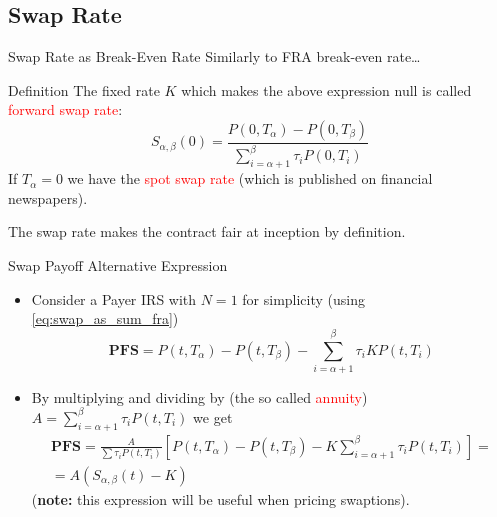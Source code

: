 \documentclass{beamer}
\begin{document}
\subsection{Swap Rate}
\begin{frame}{Swap Rate as Break-Even Rate}
	Similarly to FRA break-even rate\ldots
	\begin{block}{Definition}
	The fixed rate $K$ which makes the above expression null is called \textcolor{red}{forward swap rate}:
	\begin{equation}
		S_{\alpha,\beta}(0) = \frac{P(0, T_\alpha)-P(0,T_\beta)}{\sum_{i=\alpha+1}^{\beta}\tau_iP(0,T_i)}
	\end{equation}
	If $T_\alpha=0$ we have the \textcolor{red}{spot swap rate} (which is published on financial newspapers).
	\end{block}
	The swap rate makes the contract fair at inception by definition.
\end{frame}

\begin{frame}{Swap Payoff Alternative Expression}
	\begin{itemize}
		\item<1-> Consider a Payer IRS with $N=1$ for simplicity (using \cref{eq:swap_as_sum_fra})
		\begin{equation*}
			\textbf{PFS} = P(t,T_\alpha)-P(t,T_\beta)-\sum_{i=\alpha+1}^{\beta}\tau_iKP(t,T_i)
		\end{equation*}
		\item<2-> By multiplying and dividing by (the so called \textcolor{red}{annuity}) $A = \sum_{i=\alpha+1}^{\beta}\tau_i P(t, T_i)$
		we get
		\begin{equation}
			\begin{gathered}
			\textbf{PFS}=\frac{A}{\sum\tau_iP(t, T_i)}\left[P(t,T_\alpha)-P(t,T_\beta)-K\sum_{i=\alpha+1}^{\beta}\tau_i P(t,T_i)\right]=\\
			= \boxed{A (S_{\alpha,\beta}(t)-K)}
			\end{gathered}
		\label{eq:swap_payoff_with_swap_rate}
		\end{equation}
		(\textbf{note:} this expression will be useful when pricing swaptions).
	\end{itemize}
\end{frame}
\end{document}
